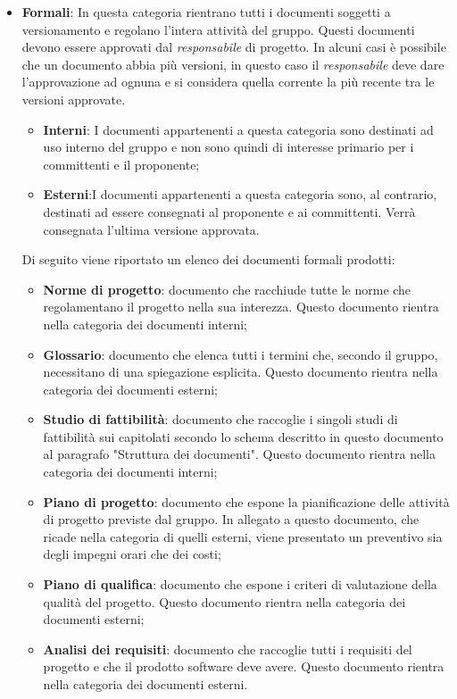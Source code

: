 \documentclass[../norme_di_progetto.tex]{subfiles}
\begin{document}
\begin{itemize}
    \item \textbf{Formali}: In questa categoria rientrano tutti i documenti soggetti a versionamento e regolano l'intera attività del gruppo. Questi documenti devono essere approvati dal \emph{responsabile} di progetto. In alcuni casi è possibile che un documento abbia più versioni, in questo caso il \emph{responsabile} deve dare l'approvazione ad ognuna e si considera quella corrente la più recente tra le versioni approvate.\par
    \begin{itemize}
        \item \textbf{Interni}: I documenti appartenenti a questa categoria sono destinati ad uso interno del gruppo e non sono quindi di interesse primario per i committenti e il proponente;
        \item \textbf{Esterni}:I documenti appartenenti a questa categoria sono, al contrario, destinati ad essere consegnati al proponente e ai committenti. Verrà consegnata l'ultima versione approvata.
    \end{itemize}
    Di seguito viene riportato un elenco dei documenti formali prodotti:
    \begin{itemize}
        \item \textbf{Norme di progetto}: documento che racchiude tutte le norme che regolamentano il progetto nella sua interezza. Questo documento rientra nella categoria dei documenti interni;
        \item \textbf{Glossario}: documento che elenca tutti i termini che, secondo il gruppo, necessitano di una spiegazione esplicita. Questo documento rientra nella categoria dei documenti esterni;
        \item \textbf{Studio di fattibilità}: documento che raccoglie i singoli studi di fattibilità sui capitolati secondo lo schema descritto in questo documento al paragrafo "Struttura dei documenti". Questo documento rientra nella categoria dei documenti interni;
        \item \textbf{Piano di progetto}: documento che espone la pianificazione delle attività di progetto previste dal gruppo. In allegato a questo documento, che ricade nella categoria di quelli esterni, viene presentato un preventivo sia degli impegni orari che dei costi;
        \item \textbf{Piano di qualifica}: documento che espone i criteri di valutazione della qualità del progetto. Questo documento rientra nella categoria dei documenti esterni;
        \item \textbf{Analisi dei requisiti}: documento che raccoglie tutti i requisiti del progetto e che il prodotto software deve avere. Questo documento rientra nella categoria dei documenti esterni.
  \end{itemize}
  
\end{itemize}
\end{document}
